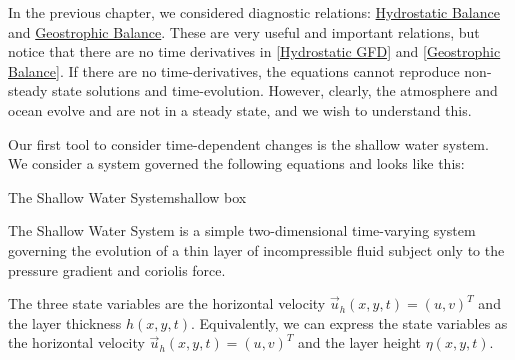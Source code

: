 In the previous chapter, we considered diagnostic relations: \hyperref[Hydrostatic GFD Box]{Hydrostatic Balance} and \hyperref[Geostrophic Box]{Geostrophic Balance}. These are very useful and important relations, but notice that there are no time derivatives in \ref{Hydrostatic GFD} and \ref{Geostrophic Balance}. If there are no time-derivatives, the equations cannot reproduce non-steady state solutions and time-evolution. However, clearly, the atmosphere and ocean evolve and are not in a steady state, and we wish to understand this.

Our first tool to consider time-dependent changes is the shallow water system. We consider a system governed the following equations and looks like this:

\begin{fact}{The Shallow Water System}{shallow box}\label{shallow box}

    The Shallow Water System is a simple two-dimensional time-varying system governing the evolution of a thin layer of incompressible fluid subject only to the pressure gradient and coriolis force.

    The three state variables are the horizontal velocity $\vec{u}_h(x,y,t)=(u,v)^T$ and the layer thickness $h(x,y,t)$. Equivalently, we can express the state variables as the horizontal velocity $\vec{u}_h(x,y,t)=(u,v)^T$ and the layer height $\eta(x,y,t)$.


\end{fact}
